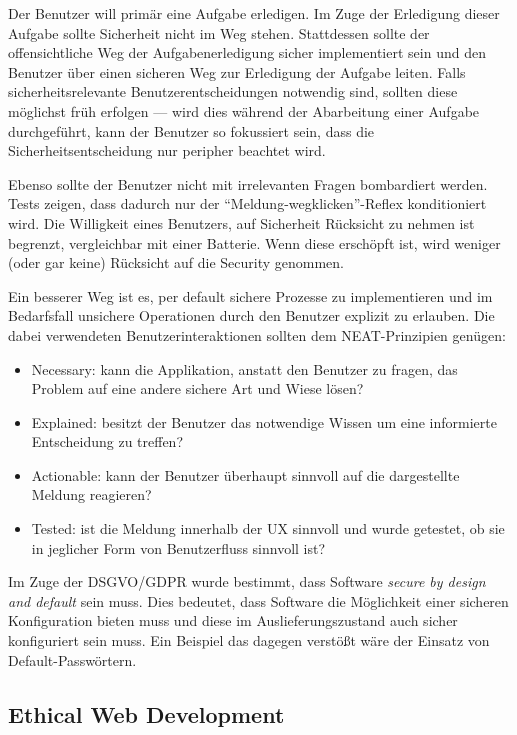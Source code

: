Der Benutzer will primär eine Aufgabe erledigen. Im Zuge der Erledigung dieser Aufgabe sollte Sicherheit nicht im Weg stehen. Stattdessen sollte der offensichtliche Weg der Aufgabenerledigung sicher implementiert sein und den Benutzer über einen sicheren Weg zur Erledigung der Aufgabe leiten. Falls sicherheitsrelevante Benutzerentscheidungen notwendig sind, sollten diese möglichst früh erfolgen --- wird dies während der Abarbeitung einer Aufgabe durchgeführt, kann der Benutzer so fokussiert sein, dass die Sicherheitsentscheidung nur peripher beachtet wird.

Ebenso sollte der Benutzer nicht mit irrelevanten Fragen bombardiert werden. Tests zeigen, dass dadurch nur der ``Meldung-wegklicken''-Reflex konditioniert wird. Die Willigkeit eines Benutzers, auf Sicherheit Rücksicht zu nehmen ist begrenzt, vergleichbar mit einer Batterie. Wenn diese erschöpft ist, wird weniger (oder gar keine) Rücksicht auf die Security genommen.

Ein besserer Weg ist es, per default sichere Prozesse zu implementieren und im Bedarfsfall unsichere Operationen durch den Benutzer explizit zu erlauben. Die dabei verwendeten Benutzerinteraktionen sollten dem NEAT-Prinzipien genügen:

\begin{itemize}
	\item Necessary: kann die Applikation, anstatt den Benutzer zu fragen, das Problem auf eine andere sichere Art und Wiese lösen?
	\item Explained: besitzt der Benutzer das notwendige Wissen um eine informierte Entscheidung zu treffen?
	\item Actionable: kann der Benutzer überhaupt sinnvoll auf die dargestellte Meldung reagieren?
	\item Tested: ist die Meldung innerhalb der UX sinnvoll und wurde getestet, ob sie in jeglicher Form von Benutzerfluss sinnvoll ist?
\end{itemize}

Im Zuge der DSGVO/GDPR wurde bestimmt, dass Software \textit{secure by design and default} sein muss. Dies bedeutet, dass Software die Möglichkeit einer sicheren Konfiguration bieten muss und diese im Auslieferungszustand auch sicher konfiguriert sein muss. Ein Beispiel das dagegen verstößt wäre der Einsatz von Default-Passwörtern.

\subsection{Ethical Web Development}


